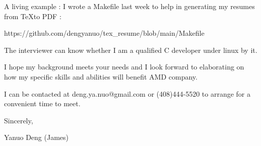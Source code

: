 { \bigbreak } 
A living example : I wrote a Makefile last week to help in generating my resumes from \TeX to PDF : 

\centerline{
https://github.com/dengyanuo/tex\_resume/blob/main/Makefile
}

The interviewer can know whether I am a qualified C developer under linux by it.

{ \bigbreak } 
I hope my background meets your needs and I look
forward to elaborating on how my specific skills and abilities will benefit AMD company.

{ \bigbreak } 
I can be contacted at deng.ya.nuo@gmail.com
or (408)444-5520 to arrange for a convenient time to meet.

{ \bigbreak } 




\vskip 60pt

{ \bigbreak } 
Sincerely,

Yanuo Deng (James)

\bye
